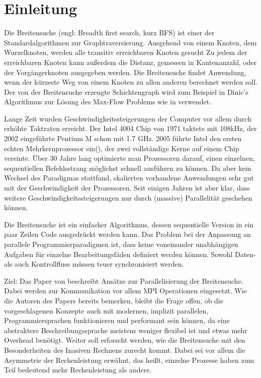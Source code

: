 \chapter{Einleitung}
\label{ch:einleitung}

Die Breitensuche (engl: Breadth first search, kurz BFS) ist einer der Standardalgorithmen zur Graphtraversierung. Ausgehend von einem Knoten, dem Wurzelknoten, werden alle transitiv erreichbaren Knoten gesucht Zu jedem der erreichbaren Knoten kann außerdem die Distanz, gemessen in Kantenanzahl, oder der Vorgängerknoten ausgegeben werden. Die Breitensuche findet Anwendung, wenn der kürzeste Weg von einem Knoten zu allen anderen berechnet werden soll. Der von der Breitensuche erzeugte Schichtengraph wird zum Beispiel in Dinic's Algorithmus zur Lösung des Max-Flow Problems wie in \cite{Dinitz:2006} verwendet. 

Lange Zeit wurden Geschwindigkeitssteigerungen der Computer vor allem durch erhöhte Taktraten erreicht. Der Intel 4004 Chip von 1971 taktete mit 108kHz, der 2002 eingeführte Pentium M schon mit 1.7 GHz. 2005 führte Intel den ersten echten Mehrkernprozessor ein(\cite{Intel:2006:Online}), der zwei vollständige Kerne auf einem Chip vereinte. Über 30 Jahre lang optimierte man Prozessoren darauf, einen einzelnen, sequentiellen Befehlsstrang möglichst schnell ausführen zu können. Da aber kein Wechsel des Paradigmas stattfand, skalierten vorhandene Anwendungen sehr gut mit der Geschwindigkeit der Prozessoren. Seit einigen Jahren ist aber klar, dass weitere Geschwindigkeitssteigerungen nur durch (massive) Parallelität geschehen können.  

Die Breitensuche ist ein einfacher Algorithmus, dessen sequentielle Version in ein paar Zeilen Code ausgedrückt werden kann. Das Problem bei der Anpassung an parallele Programmierparadigmen ist, dass keine voneinander unabhängigen Aufgaben für einzelne Bearbeitungsfäden definiert werden können. Sowohl Daten- als auch Kontrollfluss müssen teuer synchronisiert werden.


Ziel:
Das Paper von \cite{Buluc:2011} beschreibt Ansätze zur Parallelisierung der Breitensuche. Dabei werden zur Kommunikation vor allem MPI Operationen eingesetzt. Wie die Autoren des Papers bereits bemerken, bleibt die Frage offen, ob die vorgeschlagenen Konzepte auch mit modernen, implizit parallelen, Programmiersprachen funktionieren und performant sein können, da eine abstraktere Beschreibungssprache meistens weniger flexibel ist und etwas mehr Overhead benötigt. Weiter soll erforscht werden, wie die Breitensuche mit den Besonderheiten des Inasiven Rechnens zurecht kommt. Dabei sei vor allem die Asymmetrie der Rechenleistung erwähnt, das heißt, einzelne Prozesse haben zum Teil bedeutend mehr Rechenleistung als andere.